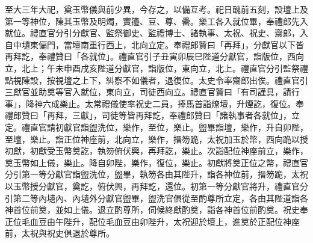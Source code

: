 \begin{pinyinscope}
 至大三年大祀，奠玉幣儀與前少異，今存之，以備互考。祀日醜前五刻，設壇上及第一等神位，陳其玉幣及明燭，實籩、豆、尊、罍。樂工各入就位畢，奉禮郎先入就位。禮直官分引分獻官、監祭御史、監禮博士、諸執事、太祝、祝史、齋郎，入自中壝東偏門，當壇南重行西上，北向立定。奉禮郎贊曰「再拜」，分獻官以下皆再拜訖，奉禮贊曰「各就位」。禮直官引子丑寅卯辰巳陛道分獻官，詣版位，西向立，北上；午未申酉戌亥陛道分獻官，詣版位，東向立，北上。禮直官分引監祭禮點視陳設，按視壇之上下，糾察不如儀者，退復位。太史令率齋郎出俟。禮直官引三獻官並助奠等官入就位，東向立，司徒西向立。禮直官贊曰「有司謹具，請行事」，降神六成樂止。太常禮儀使率祝史二員，捧馬首詣燎壇，升煙訖，復位。奉禮郎贊曰「再拜，三獻」，司徒等皆再拜訖，奉禮郎贊曰「諸執事者各就位」，立定。禮直官請初獻官詣盥洗位，樂作，至位，樂止。盥畢詣壇，樂作，升自卯陛，至壇，樂止。詣正位神座前，北向立，樂作，搢笏跪，太祝加玉於幣，西向跪以授初獻，初獻受玉幣奠訖，執笏俯伏興，再拜訖，樂止。次詣配位神座前立，樂作，奠玉幣如上儀，樂止。降自卯陛，樂作，復位，樂止。初獻將奠正位之幣，禮直官分引第一等分獻官詣盥洗位，盥畢，執笏各由其陛升，詣各神位前，搢笏跪，太祝以玉幣授分獻官，奠訖，俯伏興，再拜訖，還位。初第一等分獻官將升，禮直官分引第二等內壝內、內壝外分獻官盥畢，盥洗官俱從至酌尊所立定，各由其陛道詣各神首位前奠，並如上儀。退立酌尊所，伺候終獻酌奠，詣各神首位前酌奠。祝史奉正位毛血豆由午陛升，配位毛血豆由卯陛升，太祝迎於壇上，進奠於正配位神座前，太祝與祝史俱退於尊所。




\end{pinyinscope}
